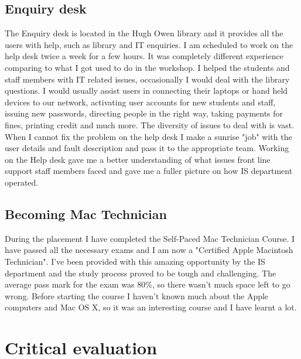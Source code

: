 \documentclass[10pt,a4paper,headinclude=true]{report}
\begin{document}
\section{Enquiry desk}
The Enquiry desk is located in the Hugh Owen library and it provides all the users with help, such as library and IT enquiries. I am scheduled to work on the help desk twice a week for a few hours. It was completely different experience comparing to what I got used to do in the workshop. I helped the students and staff members with IT related issues, occasionally I would deal with the library questions. I would usually assist users in connecting their laptops or hand held devices to our network, activating user accounts for new students and staff, issuing new passwords, directing people in the right way, taking payments for fines, printing credit and much more. The diversity of issues to deal with is vast. When I cannot fix the problem on the help desk I make a sunrise "job" with the user details and fault description and pass it to the appropriate team. Working on the Help desk gave me a better understanding of what issues front line support staff members faced and gave me a fuller picture on how IS department operated.
  
\section{Becoming Mac Technician}
During the placement I have completed the Self-Paced Mac Technician Course. I have passed all the necessary exams and I am now a "Certified Apple Macintosh Technician". I've been provided with this amazing opportunity by the IS department and the study process proved to be tough and challenging. The average pass mark for the exam was 80\%, so there wasn't much space left to go wrong. Before starting the course I haven't known much about the Apple computers and Mac OS X, so it was an interesting course and I have learnt a lot. 
\chapter{Critical evaluation}
\end{document}
